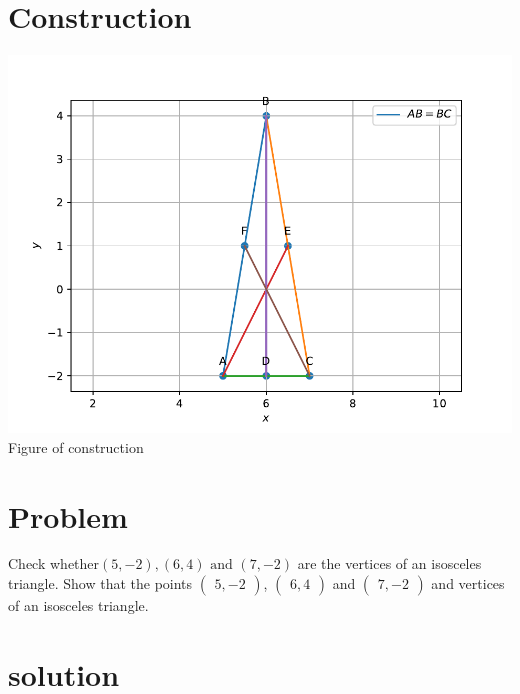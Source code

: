 \documentclass[10pt, a4paper]{article}
\title{\mytitle}
\author{\myauthor\hspace{1em}\\\contact\\FWC220107\hspace{6.5em}IITH\hspace{0.5em}\mymodule\hspace{6em}ASSIGN-1}
\date{}
\newcommand{\myvec}[1]{\ensuremath{\begin{pmatrix}#1\end{pmatrix}}}
\begin{document}
 \maketitle
 \tableofcontents
\section{Construction}                                                                    \begin{center}
  \includegraphics[scale=0.39]{par.pdf}
\\  Figure of construction
   \end{center}
 
   \section{Problem}
  Check whether$(5,-2),(6,4) \text{ and } (7,-2)$ are the vertices of an isosceles triangle.
Show that the points $\myvec{5, -2}$, $\myvec{6,4}$ and $\myvec{7, -2}$ and vertices of an isosceles  triangle.
 \section{solution} 
\end{document}
